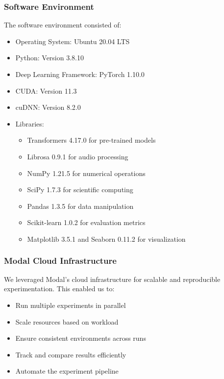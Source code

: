 \documentclass[12pt]{article}
\begin{document}
\subsubsection{Software Environment}
The software environment consisted of:
\begin{itemize}
    \item Operating System: Ubuntu 20.04 LTS
    \item Python: Version 3.8.10
    \item Deep Learning Framework: PyTorch 1.10.0
    \item CUDA: Version 11.3
    \item cuDNN: Version 8.2.0
    \item Libraries:
    \begin{itemize}
        \item Transformers 4.17.0 for pre-trained models
        \item Librosa 0.9.1 for audio processing
        \item NumPy 1.21.5 for numerical operations
        \item SciPy 1.7.3 for scientific computing
        \item Pandas 1.3.5 for data manipulation
        \item Scikit-learn 1.0.2 for evaluation metrics
        \item Matplotlib 3.5.1 and Seaborn 0.11.2 for visualization
    \end{itemize}
\end{itemize}

\subsubsection{Modal Cloud Infrastructure}
We leveraged Modal's cloud infrastructure for scalable and reproducible experimentation. This enabled us to:
\begin{itemize}
    \item Run multiple experiments in parallel
    \item Scale resources based on workload
    \item Ensure consistent environments across runs
    \item Track and compare results efficiently
    \item Automate the experiment pipeline
\end{itemize}
\end{document}
